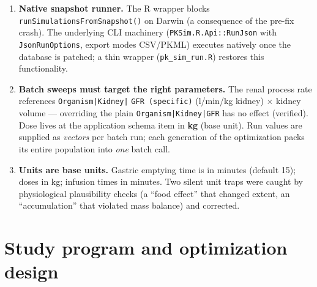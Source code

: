 \begin{enumerate}
\item \textbf{Native snapshot runner.} The R wrapper blocks \texttt{runSimulationsFromSnapshot()} on Darwin (a consequence of the pre-fix crash). The underlying CLI machinery (\texttt{PKSim.R.Api::RunJson} with \texttt{JsonRunOptions}, export modes CSV/PKML) executes natively once the database is patched; a thin wrapper (\texttt{pk\_sim\_run.R}) restores this functionality.
\item \textbf{Batch sweeps must target the right parameters.} The renal process rate references \texttt{Organism|Kidney|}
\texttt{GFR (specific)} (l/min/kg kidney) $\times$ kidney volume --- overriding the plain \texttt{Organism|Kidney|GFR} has no effect (verified). Dose lives at the application schema item in \textbf{kg} (base unit). Run values are supplied as \emph{vectors} per batch run; each generation of the optimization packs its entire population into \emph{one} batch call.
\item \textbf{Units are base units.} Gastric emptying time is in minutes (default 15); doses in kg; infusion times in minutes. Two silent unit traps were caught by physiological plausibility checks (a ``food effect'' that changed extent, an ``accumulation'' that violated mass balance) and corrected.
\end{enumerate}

\section{Study program and optimization design}
\label{sec:pksim-ga-design}

